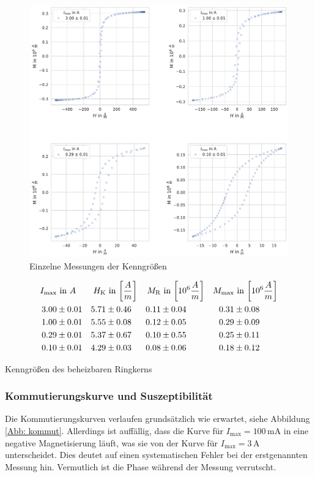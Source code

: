 \documentclass[12pt,a4paper]{scrartcl}
\numberwithin{equation}{section} %
\begin{document}
\begin{figure}[ht]
\centering
\includegraphics[scale=0.6]{../media/B2.4/3.3.1_single_measures.pdf}
\caption{Einzelne Messungen der Kenngrößen}
\label{Abb: heizbar kenngrößen}
\end{figure}

\begin{table}
	\begin{align*}
		I_\mathrm{max} &\text{ in } A &
		H_\mathrm{K} &\text{ in }
		{\tiny \left[ \frac{A}{m} \right] } &
		M_\mathrm{R} &\text{ in }
		{\tiny \left[10^6  \frac{A}{m} \right] } &
		M_\mathrm{max} &\text{ in }
		{\tiny \left[10^6 \frac{A}{m} \right] }
		\\
		3.00 &\pm 0.01 &
			5.71 &\pm 0.46 &
			0.11 &\pm 0.04 &
			0.31 &\pm 0.08
			\\
		1.00 &\pm 0.01 &
			5.55 &\pm 0.08 &
			0.12 &\pm 0.05 &
			0.29 &\pm 0.09
			\\
		0.29 &\pm 0.01 &
			5.37 &\pm 0.67 &
			0.10 &\pm 0.55 &
			0.25 &\pm 0.11
			\\
		0.10 &\pm 0.01 &
			4.29 &\pm 0.03 &
			0.08 &\pm 0.06 &
			0.18 &\pm 0.12
	\end{align*}
	\caption{Kenngrößen des beheizbaren Ringkerns}
	\label{Tab: heizbar kenngrößen}
\end{table}

\hypertarget{kommutierungskurve-und-suszeptibilituxe4t}{%
\subsubsection{Kommutierungskurve und Suszeptibilität}\label{kommutierungskurve-und-suszeptibilituxe4t}}
Die Kommutierungskurven verlaufen grundsätzlich wie erwartet, siehe Abbildung \ref{Abb: kommut}. Allerdings ist auffällig, dass die Kurve für $I_\mathrm{max}=100\mathrm{\,mA}$ in eine negative Magnetisierung läuft, was sie von der Kurve für $I_\mathrm{max}= 3\,\mathrm A$ unterscheidet. Dies deutet auf einen systematischen Fehler bei der erstgenannten Messung hin. Vermutlich ist die Phase während der Messung verrutscht.
\end{document}
